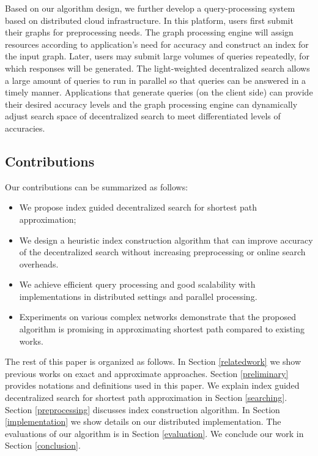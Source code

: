 Based on our algorithm design, we further develop a query-processing system based on distributed cloud infrastructure. In this platform, users first submit their graphs for preprocessing needs. The graph processing engine will assign resources according to application's need for accuracy and construct an index for the input graph. Later, users may submit large volumes of queries repeatedly, for which responses will be generated. The light-weighted decentralized search allows a large amount of queries to run in parallel so that queries can be answered in a timely manner. Applications that generate queries (on the client side) can provide their desired accuracy levels and the graph processing engine can dynamically adjust search space of decentralized search to meet differentiated levels of accuracies.

\subsection{Contributions}
Our contributions can be summarized as follows:

\begin{itemize}
	\item We propose index guided decentralized search for shortest path approximation;
	\item We design a heuristic index construction algorithm that can improve accuracy of the decentralized search without increasing preprocessing or online search overheads.
	\item We achieve efficient query processing and good scalability with implementations in distributed settings and parallel processing.
	\item Experiments on various complex networks demonstrate that the proposed algorithm is promising in approximating shortest path compared to existing works.
\end{itemize}

The rest of this paper is organized as follows. In Section \ref{relatedwork} we show previous works on exact and approximate approaches. Section \ref{preliminary} provides notations and definitions used in this paper. We explain index guided decentralized search for shortest path approximation in Section \ref{searching}. Section \ref{preprocessing} discusses index construction algorithm. In Section \ref{implementation} we show details on our distributed implementation. The evaluations of our algorithm is in Section \ref{evaluation}.  We conclude our work in Section \ref{conclusion}.
